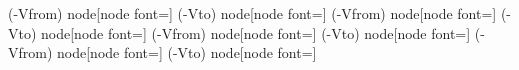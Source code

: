 {            \ifpgf@circ@fixbatteries
                \ifpgf@circuit@bipole@voltage@backward
                    (\pgfcirc@a@prefix-Vfrom)  node[node font=\pgf@circ@avfont] {\pgf@circ@avplus}
                    (\pgfcirc@a@prefix-Vto) node[node font=\pgf@circ@avfont] {\pgf@circ@avminus}
                \else
                    (\pgfcirc@a@prefix-Vfrom)  node[node font=\pgf@circ@avfont] {\pgf@circ@avminus}
                    (\pgfcirc@a@prefix-Vto) node[node font=\pgf@circ@avfont] {\pgf@circ@avplus}
                \fi
                \else
                \ifpgf@circuit@bipole@voltage@backward
                    (\pgfcirc@a@prefix-Vfrom)  node[node font=\pgf@circ@avfont] {\pgf@circ@avminus}
                    (\pgfcirc@a@prefix-Vto) node[node font=\pgf@circ@avfont] {\pgf@circ@avplus}
                \else
                    (\pgfcirc@a@prefix-Vfrom)  node[node font=\pgf@circ@avfont] {\pgf@circ@avplus}
                    (\pgfcirc@a@prefix-Vto) node[node font=\pgf@circ@avfont] {\pgf@circ@avminus}
                \fi
            \fi
        \fi
    \fi
    \fi %
    \fi %
}

